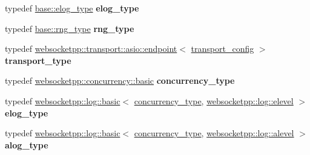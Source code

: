 \begin{DoxyCompactItemize}
typedef \mbox{\hyperlink{classwebsocketpp_1_1log_1_1basic}{base\+::elog\+\_\+type}} {\bfseries elog\+\_\+type}
\item 
\mbox{\label{classconfig_a51e474b4b9e1948b0f304c482b2474b5}} 
typedef \mbox{\hyperlink{classwebsocketpp_1_1random_1_1none_1_1int__generator}{base\+::rng\+\_\+type}} {\bfseries rng\+\_\+type}
\item 
\mbox{\label{classconfig_afac55cb30b371d2299b5d6767d89325f}} 
typedef \mbox{\hyperlink{classwebsocketpp_1_1transport_1_1asio_1_1endpoint}{websocketpp\+::transport\+::asio\+::endpoint}}$<$ \mbox{\hyperlink{structconfig_1_1transport__config}{transport\+\_\+config}} $>$ {\bfseries transport\+\_\+type}
\item 
\mbox{\label{classconfig_ac0887fd1fa6dd32b541f9a1705a09387}} 
typedef \mbox{\hyperlink{classwebsocketpp_1_1concurrency_1_1basic}{websocketpp\+::concurrency\+::basic}} {\bfseries concurrency\+\_\+type}
\item 
\mbox{\label{classconfig_a298a582b7f4f06af3bcd91c1a285c693}} 
typedef \mbox{\hyperlink{classwebsocketpp_1_1log_1_1basic}{websocketpp\+::log\+::basic}}$<$ \mbox{\hyperlink{classwebsocketpp_1_1concurrency_1_1none}{concurrency\+\_\+type}}, \mbox{\hyperlink{structwebsocketpp_1_1log_1_1elevel}{websocketpp\+::log\+::elevel}} $>$ {\bfseries elog\+\_\+type}
\item 
\mbox{\label{classconfig_af3175c9be7ea9f799463680577ed3f9f}} 
typedef \mbox{\hyperlink{classwebsocketpp_1_1log_1_1basic}{websocketpp\+::log\+::basic}}$<$ \mbox{\hyperlink{classwebsocketpp_1_1concurrency_1_1none}{concurrency\+\_\+type}}, \mbox{\hyperlink{structwebsocketpp_1_1log_1_1alevel}{websocketpp\+::log\+::alevel}} $>$ {\bfseries alog\+\_\+type}
\end{DoxyCompactItemize}
